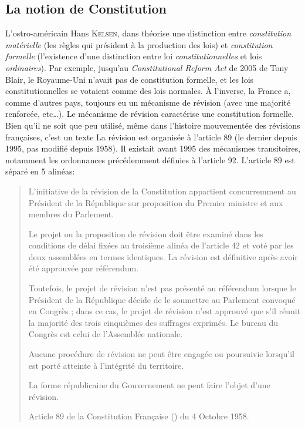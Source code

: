 \documentclass[math]{cours}
\begin{document}
\subsection{La notion de Constitution}
L'ostro-américain Hans \textsc{Kelsen}, dans \cite{KelsenTheo} théorise une distinction entre \emph{constitution matérielle} (les règles qui président à la production des lois) et \emph{constitution formelle} (l'existence d'une distinction entre loi \emph{constitutionnelles} et lois \emph{ordinaires}).
Par exemple, jusqu'au \emph{Constitutional Reform Act} de 2005 de Tony Blair, le Royaume-Uni n'avait pas de constitution formelle, et les lois constitutionnelles se votaient comme des lois normales.
À l'inverse, la France a, comme d'autres pays, toujours eu un mécanisme de révision (avec une majorité renforcée, etc\ldots).
Le mécanisme de révision caractérise une constitution formelle.
Bien qu'il ne soit que peu utilisé, même dans l'histoire mouvementée des révisions françaises, c'est un texte
La révision est organisée à l'article 89 (le dernier depuis 1995, pas modifié depuis 1958). Il existait avant 1995 des mécanismes transitoires, notamment les ordonnances précédemment définies à l'article 92.
L'article 89 est séparé en 5 alinéas:
\begin{quote}
	L'initiative de la révision de la Constitution appartient concurremment au Président de la République sur proposition du Premier ministre et aux membres du Parlement.

Le projet ou la proposition de révision doit être examiné dans les conditions de délai fixées au troisième alinéa de l'article 42 et voté par les deux assemblées en termes identiques. La révision est définitive après avoir été approuvée par référendum.

Toutefois, le projet de révision n'est pas présenté au référendum lorsque le Président de la République décide de le soumettre au Parlement convoqué en Congrès ; dans ce cas, le projet de révision n'est approuvé que s'il réunit la majorité des trois cinquièmes des suffrages exprimés. Le bureau du Congrès est celui de l'Assemblée nationale.

Aucune procédure de révision ne peut être engagée ou poursuivie lorsqu'il est porté atteinte à l'intégrité du territoire.

La forme républicaine du Gouvernement ne peut faire l'objet d'une révision.
\begin{center}
	Article 89 de la Constitution Française (\cite{constitution}) du 4 Octobre 1958.
\end{center}
\end{quote}
\end{document}
